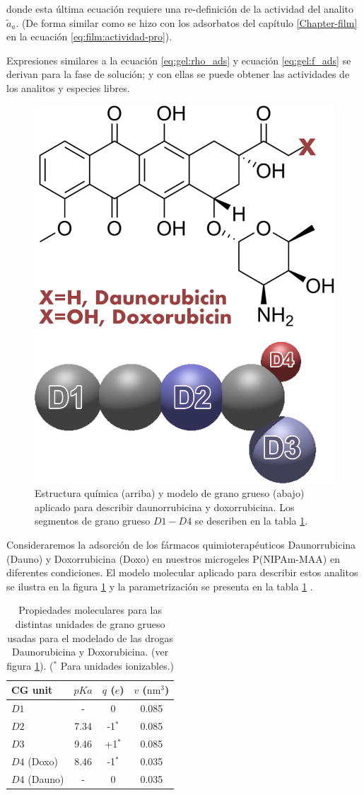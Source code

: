 \noindent donde esta \'ultima ecuaci\'on requiere una re-definici\'on de la actividad del analito $\tilde{a}_a$. (De forma similar como se hizo con los adsorbatos del cap\'itulo \ref{Chapter-film} en la ecuaci\'on \ref{eq:film:actividad-pro}).

Expresiones similares a la ecuaci\'on \ref{eq:gel:rho_ads} y ecuaci\'on \ref{eq:gel:f_ads} se derivan para la fase de soluci\'on; y con ellas se puede obtener las actividades  de los analitos y especies libres. 



\begin{figure}[!tb]
\centering
\includegraphics[width=0.35\linewidth]{Figures/graph-gel/dauno-doxo.png}
\caption{Estructura qu\'imica (arriba) y modelo de grano grueso (abajo) aplicado para describir daunorrubicina y doxorrubicina.
	Los segmentos de grano grueso $D1-D4$ se describen en la tabla \ref{table:gel:drugs}.}
\label{fig:gel:dauno-doxo}
\end{figure}


Consideraremos la adsorci\'on de los f\'armacos quimioterap\'euticos Daunorrubicina (Dauno) y Doxorrubicina (Doxo) en nuestros microgeles P(NIPAm-MAA) en diferentes condiciones.
El modelo molecular aplicado para describir estos analitos se ilustra en la figura \ref{fig:gel:dauno-doxo} y la parametrizaci\'on se presenta en la tabla \ref{table:gel:drugs} \cite{perez2020triggering}.

\begin{table}
\centering
\begin{tabular}{|lccc|}
    \hline
    {CG unit} & {$pKa$} & {$q$ ($e$)} & {$v$ ($\text{nm}^3$)} \\
      \hline
$D1$ & - & 0 & 0.085\\
$D2$ & 7.34 & -1$^\ast$ & 0.085\\
$D3$ & 9.46 & +1$^\ast$ & 0.085\\ 
$D4$ (Doxo) & 8.46 & -1$^\ast$ & 0.035\\
$D4$ (Dauno) & - & 0 & 0.035 \\
    \hline
  \end{tabular}
 \caption{Propiedades moleculares para las distintas unidades de grano grueso usadas para el modelado de las drogas Daunorubicina y Doxorubicina. (ver figura \ref{fig:gel:dauno-doxo}).
 ($^\ast$ Para unidades ionizables.)}
\label{table:gel:drugs} 
\end{table}




